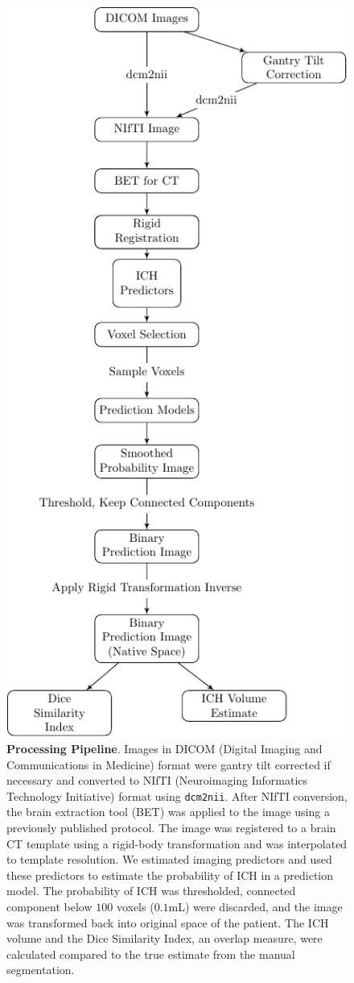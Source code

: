 \documentclass{elsarticle_nonatbib}\usepackage[]{graphicx}\usepackage[]{color}
\begin{document}


\begin{figure}
\centering
\includegraphics[width=0.5\linewidth]{Imaging_Pipeline_Flowchart_with_Rigid.pdf}
\caption{{\bf Processing Pipeline}.  Images in DICOM (Digital Imaging and Communications in Medicine) format were gantry tilt corrected if necessary and converted to NIfTI (Neuroimaging Informatics Technology Initiative) format using \texttt{dcm2nii}.  After NIfTI conversion, the brain extraction tool (BET) was applied to the image using a previously published protocol.  The image was registered to a brain CT template using a rigid-body transformation and was interpolated to template resolution.  We estimated imaging predictors and used these predictors to estimate the probability of ICH in a prediction model.  The probability of ICH was thresholded, connected component below $100$ voxels ($0.1$mL) were discarded, and the image was transformed back into original space of the patient.  The ICH volume and the Dice Similarity Index, an overlap measure, were calculated compared to the true estimate from the manual segmentation.  }
\label{fig:framework}
\end{figure}
\end{document}
